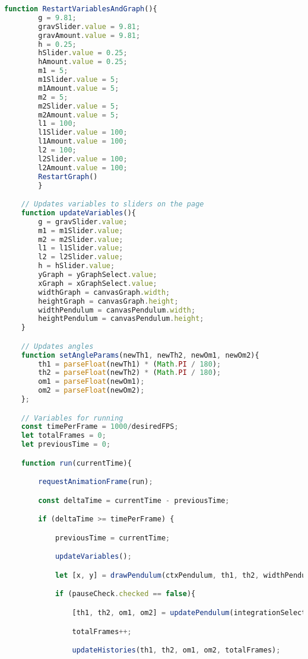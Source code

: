 \documentclass[12pt]{article}
\begin{document}
\begin{lstlisting}[language=JavaScript]
    function RestartVariablesAndGraph(){
        g = 9.81;
        gravSlider.value = 9.81;
        gravAmount.value = 9.81;
        h = 0.25;
        hSlider.value = 0.25;
        hAmount.value = 0.25;
        m1 = 5;
        m1Slider.value = 5;
        m1Amount.value = 5;
        m2 = 5;
        m2Slider.value = 5;
        m2Amount.value = 5;
        l1 = 100;
        l1Slider.value = 100;
        l1Amount.value = 100;
        l2 = 100;
        l2Slider.value = 100;
        l2Amount.value = 100;
        RestartGraph()
        }

    // Updates variables to sliders on the page
    function updateVariables(){
        g = gravSlider.value;
        m1 = m1Slider.value;
        m2 = m2Slider.value;
        l1 = l1Slider.value;
        l2 = l2Slider.value;
        h = hSlider.value;
        yGraph = yGraphSelect.value;
        xGraph = xGraphSelect.value;
        widthGraph = canvasGraph.width;
        heightGraph = canvasGraph.height;
        widthPendulum = canvasPendulum.width;
        heightPendulum = canvasPendulum.height;
    }

    // Updates angles
    function setAngleParams(newTh1, newTh2, newOm1, newOm2){
        th1 = parseFloat(newTh1) * (Math.PI / 180);
        th2 = parseFloat(newTh2) * (Math.PI / 180);
        om1 = parseFloat(newOm1);
        om2 = parseFloat(newOm2);
    };

    // Variables for running
    const timePerFrame = 1000/desiredFPS;
    let totalFrames = 0;
    let previousTime = 0;

    function run(currentTime){

        requestAnimationFrame(run); 

        const deltaTime = currentTime - previousTime;

        if (deltaTime >= timePerFrame) {

            previousTime = currentTime;

            updateVariables();

            let [x, y] = drawPendulum(ctxPendulum, th1, th2, widthPendulum, heightPendulum);

            if (pauseCheck.checked == false){

                [th1, th2, om1, om2] = updatePendulum(integrationSelect.value, h, th1, th2, om1, om2);

                totalFrames++;

                updateHistories(th1, th2, om1, om2, totalFrames);


\end{lstlisting}
\end{document}
